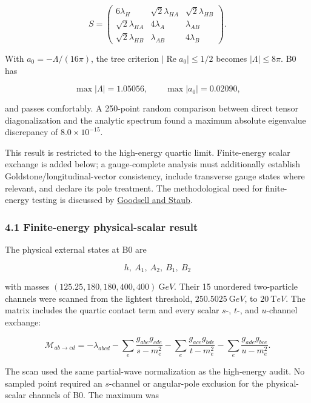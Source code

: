 \documentclass[
]{article}
\begin{document}
\[
S=\begin{pmatrix}
6\lambda_H&\sqrt2\lambda_{HA}&\sqrt2\lambda_{HB}\\
\sqrt2\lambda_{HA}&4\lambda_A&\lambda_{AB}\\
\sqrt2\lambda_{HB}&\lambda_{AB}&4\lambda_B
\end{pmatrix}.
\]

With \(a_0=-\Lambda/(16\pi)\), the tree criterion
\(|\operatorname{Re}a_0|\le1/2\) becomes \(|\Lambda|\le8\pi\). B0 has

\[
\max|\Lambda|=1.05056,
\qquad
\max|a_0|=0.02090,
\]

and passes comfortably. A 250-point random comparison between direct
tensor diagonalization and the analytic spectrum found a maximum
absolute eigenvalue discrepancy of \(8.0\times10^{-15}\).

This result is restricted to the high-energy quartic limit.
Finite-energy scalar exchange is added below; a gauge-complete analysis
must additionally establish Goldstone/longitudinal-vector consistency,
include transverse gauge states where relevant, and declare its pole
treatment. The methodological need for finite-energy testing is
discussed by \href{https://arxiv.org/abs/1805.07306}{Goodsell and
Staub}.

\hypertarget{finite-energy-physical-scalar-result}{%
\subsubsection{4.1 Finite-energy physical-scalar
result}\label{finite-energy-physical-scalar-result}}

The physical external states at B0 are

\[
h,\ A_1,\ A_2,\ B_1,\ B_2
\]

with masses \((125.25,180,180,400,400)\ {\mathrm GeV}\). Their 15
unordered two-particle channels were scanned from the lightest
threshold, \(250.5025\ {\mathrm GeV}\), to \(20\ {\mathrm TeV}\). The
matrix includes the quartic contact term and every scalar \(s\)-,
\(t\)-, and \(u\)-channel exchange:

\[
\mathcal M_{ab\to cd}=-\lambda_{abcd}
-\sum_e\frac{g_{abe}g_{cde}}{s-m_e^2}
-\sum_e\frac{g_{ace}g_{bde}}{t-m_e^2}
-\sum_e\frac{g_{ade}g_{bce}}{u-m_e^2}.
\]

The scan used the same partial-wave normalization as the high-energy
audit. No sampled point required an \(s\)-channel or angular-pole
exclusion for the physical-scalar channels of B0. The maximum was
\end{document}
